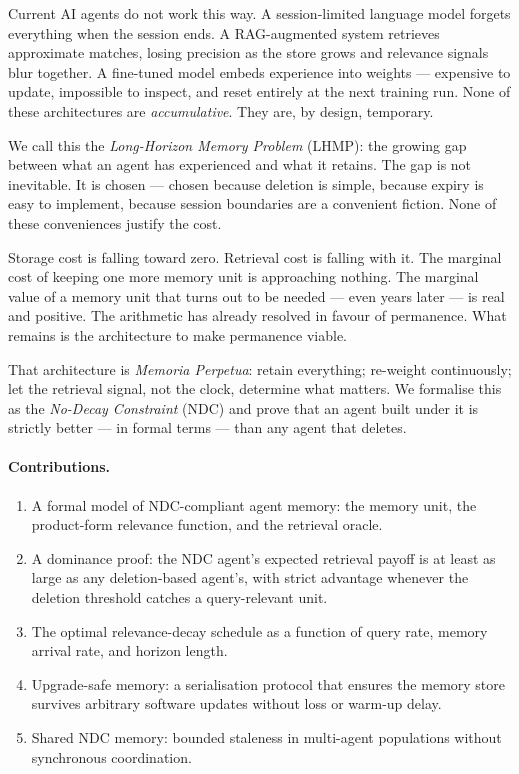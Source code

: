 \documentclass[12pt]{article}
\begin{document}
Current AI agents do not work this way.  A session-limited language model
forgets everything when the session ends.  A RAG-augmented system retrieves
approximate matches, losing precision as the store grows and relevance signals
blur together.  A fine-tuned model embeds experience into weights — expensive
to update, impossible to inspect, and reset entirely at the next training run.
None of these architectures are \emph{accumulative}.  They are, by design,
temporary.

We call this the \emph{Long-Horizon Memory Problem} (LHMP): the growing gap
between what an agent has experienced and what it retains.  The gap is not
inevitable.  It is chosen — chosen because deletion is simple, because
expiry is easy to implement, because session boundaries are a convenient
fiction.  None of these conveniences justify the cost.

Storage cost is falling toward zero.  Retrieval cost is falling with it.
The marginal cost of keeping one more memory unit is approaching nothing.
The marginal value of a memory unit that turns out to be needed — even years
later — is real and positive.  The arithmetic has already resolved in favour
of permanence.  What remains is the architecture to make permanence viable.

That architecture is \emph{Memoria Perpetua}: retain everything; re-weight
continuously; let the retrieval signal, not the clock, determine what matters.
We formalise this as the \emph{No-Decay Constraint} (NDC) and prove that an
agent built under it is strictly better — in formal terms — than any agent
that deletes.

\paragraph{Contributions.}
\begin{enumerate}[label=(\arabic*)]
  \item A formal model of NDC-compliant agent memory: the memory unit, the
    product-form relevance function, and the retrieval oracle.
  \item A dominance proof: the NDC agent's expected retrieval payoff is at least
    as large as any deletion-based agent's, with strict advantage whenever
    the deletion threshold catches a query-relevant unit.
  \item The optimal relevance-decay schedule as a function of query rate,
    memory arrival rate, and horizon length.
  \item Upgrade-safe memory: a serialisation protocol that ensures the memory
    store survives arbitrary software updates without loss or warm-up delay.
  \item Shared NDC memory: bounded staleness in multi-agent populations without
    synchronous coordination.
\end{enumerate}
\end{document}

